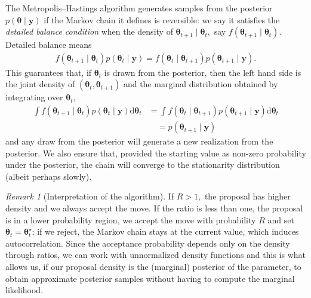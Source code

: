\documentclass[
  11pt,
  letterpaper,
]{scrbook}
\theoremstyle{definition}
\theoremstyle{plain}
\theoremstyle{plain}
\theoremstyle{definition}
\theoremstyle{definition}
\theoremstyle{remark}
\newtheorem*{remark}{Remark}
\begin{document}
The Metropolis--Hastings algorithm generates samples from the posterior
\(p(\boldsymbol{\theta} \mid \boldsymbol{y})\) if the Markov chain it
defines is reversible: we say it satisfies the \emph{detailed balance
condition} when the density of
\(\boldsymbol{\theta}_{t+1} \mid \boldsymbol{\theta}_{t},\) say
\(f(\boldsymbol{\theta}_{t+1} \mid \boldsymbol{\theta}_{t}).\) Detailed
balance means \begin{align*}
f(\boldsymbol{\theta}_{t+1} \mid \boldsymbol{\theta}_{t})p(\boldsymbol{\theta}_{t} \mid \boldsymbol{y}) = f(\boldsymbol{\theta}_{t} \mid \boldsymbol{\theta}_{t+1})p(\boldsymbol{\theta}_{t+1} \mid \boldsymbol{y}).
\end{align*} This guarantees that, if \(\boldsymbol{\theta}_{t}\) is
drawn from the posterior, then the left hand side is the joint density
of \((\boldsymbol{\theta}_{t}, \boldsymbol{\theta}_{t+1})\) and the
marginal distribution obtained by integrating over
\(\boldsymbol{\theta}_{t},\) \begin{align*}
\int f(\boldsymbol{\theta}_{t+1} \mid \boldsymbol{\theta}_{t})p(\boldsymbol{\theta}_{t} \mid \boldsymbol{y})\mathrm{d} \boldsymbol{\theta}_{t}
& = \int f(\boldsymbol{\theta}_{t} \mid \boldsymbol{\theta}_{t+1})p(\boldsymbol{\theta}_{t+1} \mid \boldsymbol{y})\mathrm{d} \boldsymbol{\theta}_{t} 
\\&\quad= p(\boldsymbol{\theta}_{t+1} \mid \boldsymbol{y})
\end{align*} and any draw from the posterior will generate a new
realization from the posterior. We also ensure that, provided the
starting value as non-zero probability under the posterior, the chain
will converge to the stationarity distribution (albeit perhaps slowly).

\begin{remark}[Interpretation of the algorithm]
If \(R>1,\) the proposal has higher density and we always accept the
move. If the ratio is less than one, the proposal is in a lower
probability region, we accept the move with probability \(R\) and set
\(\boldsymbol{\theta}_{t}=\boldsymbol{\theta}^{\star}_t\); if we reject,
the Markov chain stays at the current value, which induces
autocorrelation. Since the acceptance probability depends only on the
density through ratios, we can work with unnormalized density functions
and this is what allows us, if our proposal density is the (marginal)
posterior of the parameter, to obtain approximate posterior samples
without having to compute the marginal likelihood.
\end{remark}
\end{document}
